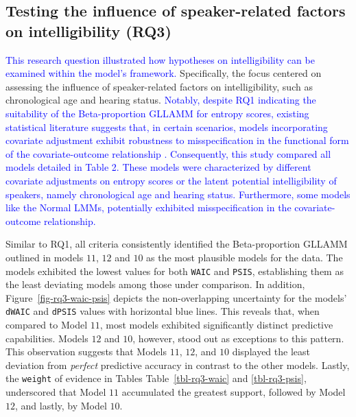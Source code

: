 \documentclass[
  authoryear,
  preprint,
  1p]{elsarticle}
\begin{document}
\subsection{Testing the influence of speaker-related factors on
intelligibility (RQ3)}\label{sec-R-RQ3}

\textcolor{blue}{This research question illustrated how hypotheses on intelligibility
can be examined within the model's framework.} Specifically, the focus
centered on assessing the influence of speaker-related factors on
intelligibility, such as chronological age and hearing status. \textcolor{blue}{Notably,
despite RQ1 indicating the suitability of the Beta-proportion GLLAMM for
entropy scores, existing statistical literature suggests that, in
certain scenarios, models incorporating covariate adjustment exhibit
robustness to misspecification in the functional form of the
covariate-outcome relationship \citep{Tackney_et_al_2023}. Consequently,
this study compared all models detailed in Table 2. These models were
characterized by different covariate adjustments on entropy scores or
the latent potential intelligibility of speakers, namely chronological
age and hearing status. Furthermore, some models like the Normal LMMs,
potentially exhibited misspecification in the covariate-outcome
relationship.}

Similar to RQ1, all criteria consistently identified the Beta-proportion
GLLAMM outlined in models \(11\), \(12\) and \(10\) as the most
plausible models for the data. The models exhibited the lowest values
for both \texttt{WAIC} and \texttt{PSIS}, establishing them as the least
deviating models among those under comparison. In addition,
Figure~\ref{fig-rq3-waic-psis} depicts the non-overlapping uncertainty
for the models' \texttt{dWAIC} and \texttt{dPSIS} values with horizontal
blue lines. This reveals that, when compared to Model \(11\), most
models exhibited significantly distinct predictive capabilities. Models
\(12\) and \(10\), however, stood out as exceptions to this pattern.
This observation suggests that Models \(11\), \(12\), and \(10\)
displayed the least deviation from \emph{perfect} predictive accuracy in
contrast to the other models. Lastly, the \texttt{weight} of evidence in
Tables Table~\ref{tbl-rq3-waic} and \ref{tbl-rq3-psis}, underscored that
Model \(11\) accumulated the greatest support, followed by Model \(12\),
and lastly, by Model \(10\).
\end{document}
